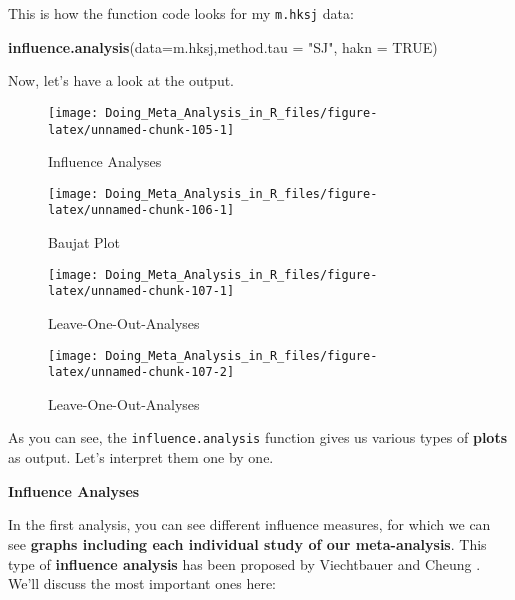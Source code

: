 \documentclass[]{book}
\newenvironment{Shaded}{\begin{snugshade}}{\end{snugshade}}
\newcommand{\KeywordTok}[1]{\textcolor[rgb]{0.13,0.29,0.53}{\textbf{#1}}}
\newcommand{\DataTypeTok}[1]{\textcolor[rgb]{0.13,0.29,0.53}{#1}}
\newcommand{\StringTok}[1]{\textcolor[rgb]{0.31,0.60,0.02}{#1}}
\newcommand{\OtherTok}[1]{\textcolor[rgb]{0.56,0.35,0.01}{#1}}
\newcommand{\NormalTok}[1]{#1}
\theoremstyle{definition}
\theoremstyle{definition}
\theoremstyle{definition}
\theoremstyle{remark}
\begin{document}
This is how the function code looks for my \texttt{m.hksj} data:

\begin{Shaded}
\begin{Highlighting}[]
\KeywordTok{influence.analysis}\NormalTok{(}\DataTypeTok{data=}\NormalTok{m.hksj,}\DataTypeTok{method.tau =} \StringTok{"SJ"}\NormalTok{, }\DataTypeTok{hakn =} \OtherTok{TRUE}\NormalTok{)}
\end{Highlighting}
\end{Shaded}

Now, let's have a look at the output.

\begin{figure}

{\centering \texttt{[image: Doing\_Meta\_Analysis\_in\_R\_files/figure-latex/unnamed-chunk-105-1]} 

}

\caption{Influence Analyses}\label{fig:unnamed-chunk-105}
\end{figure}\begin{figure}

{\centering \texttt{[image: Doing\_Meta\_Analysis\_in\_R\_files/figure-latex/unnamed-chunk-106-1]} 

}

\caption{Baujat Plot}\label{fig:unnamed-chunk-106}
\end{figure}

\begin{figure}

{\centering \texttt{[image: Doing\_Meta\_Analysis\_in\_R\_files/figure-latex/unnamed-chunk-107-1]} 

}

\caption{Leave-One-Out-Analyses}\label{fig:unnamed-chunk-1071}
\end{figure}\begin{figure}

{\centering \texttt{[image: Doing\_Meta\_Analysis\_in\_R\_files/figure-latex/unnamed-chunk-107-2]} 

}

\caption{Leave-One-Out-Analyses}\label{fig:unnamed-chunk-1072}
\end{figure}

As you can see, the \texttt{influence.analysis} function gives us
various types of \textbf{plots} as output. Let's interpret them one by
one.

\textbf{Influence Analyses}

In the first analysis, you can see different influence measures, for
which we can see \textbf{graphs including each individual study of our
meta-analysis}. This type of \textbf{influence analysis} has been
proposed by Viechtbauer and Cheung \citep{viechtbauer2010outlier}. We'll
discuss the most important ones here:
\end{document}
